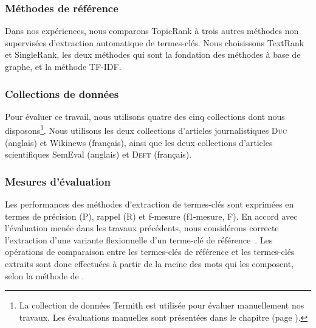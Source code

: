       \subsubsection{Méthodes de référence}
      \label{subsubsec:main:domain_independent_keyphrase_extraction-unsupervised_automatic_keyphrase_extraction-evaluation-baselines}
        Dans nos expériences, nous comparons TopicRank à trois autres
        méthodes non supervisées d'extraction automatique de termes-clés. Nous
        choisissons TextRank et SingleRank, les deux méthodes qui sont la
        fondation des méthodes à base de graphe, et la méthode TF-IDF.


      \subsubsection{Collections de données}
      \label{subsubsec:main:domain_independent_keyphrase_extraction-unsupervised_automatic_keyphrase_extraction-evaluation-evaluation_data}
        Pour évaluer ce travail, nous utilisons quatre des cinq collections dont
        nous disposons\footnote{La collection de données Termith est utilisée
        pour évaluer manuellement nos travaux. Les évaluations manuelles sont
        présentées dans le chapitre  (page \TODO{}).}. Nous utilisons
        les deux collections d'articles journalistiques \textsc{Duc} (anglais)
        et Wikinews (français), ainsi que les deux collections d'articles
        scientifiques SemEval (anglais) et \textsc{Deft} (français).

      \subsubsection{Mesures d'évaluation}
      \label{subsubsec:main:domain_independent_keyphrase_extraction-unsupervised_automatic_keyphrase_extraction-evaluation-evaluation_measures}
        Les performances des méthodes d'extraction de termes-clés sont exprimées
        en termes de précision (P), rappel (R) et f-mesure (f1-mesure, F). En
        accord avec l'évaluation menée dans les travaux précédents, nous
        considérons correcte l'extraction d'une variante flexionnelle d'un
        terme-clé de référence~\cite{kim2010semeval}. Les opérations de
        comparaison entre les termes-clés de référence et les termes-clés
        extraits sont donc effectuées à partir de la racine des mots qui les
        composent, selon la méthode de .

